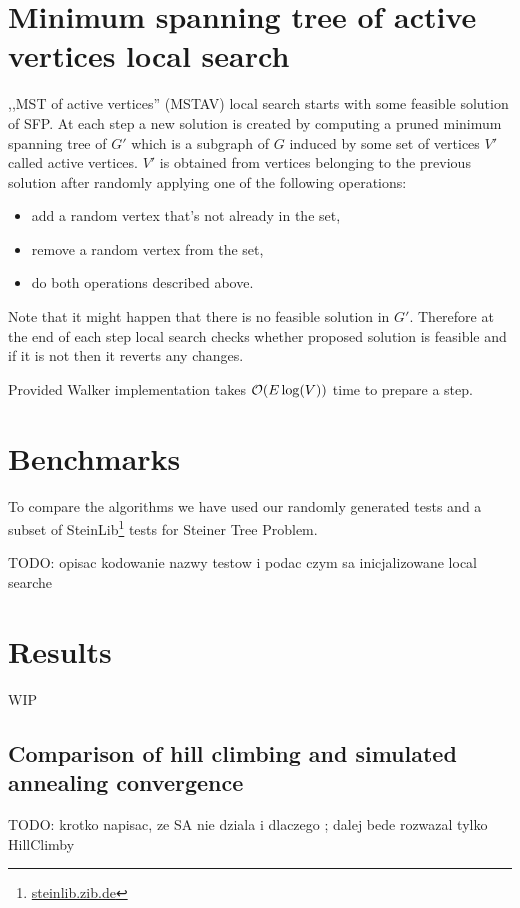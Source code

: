 \section{Minimum spanning tree of active vertices local search}
,,MST of active vertices'' (MSTAV) local search starts with some feasible solution of SFP. At each step a new solution is created by computing a pruned minimum spanning tree of $G'$ which is a subgraph of $G$ induced by some set of vertices $V'$ called active vertices. $V'$ is obtained from vertices belonging to the previous solution after randomly applying one of the following operations:
\begin{itemize}
\item add a random vertex that's not already in the set,
\item remove a random vertex from the set,
\item do both operations described above.
\end{itemize}

Note that it might happen that there is no feasible solution in $G'$. Therefore at the end of each step local search checks whether proposed solution is feasible and if it is not then it reverts any changes.

Provided Walker implementation takes $\mathcal{O}(E \log(V))$ time to prepare a step.

\section{Benchmarks}
To compare the algorithms we have used our randomly generated tests and a subset of SteinLib\footnote{\url{steinlib.zib.de}} tests for Steiner Tree Problem.

TODO: opisac kodowanie nazwy testow i podac czym sa inicjalizowane local searche

\section{Results}
WIP

\subsection{Comparison of hill climbing and simulated annealing convergence}
TODO: krotko napisac, ze SA nie dziala i dlaczego ; dalej bede rozwazal tylko HillClimby






